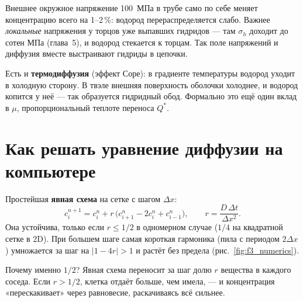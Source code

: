 
\begin{zrbox}
Внешнее окружное напряжение 100~МПа в трубе само по себе меняет концентрацию всего на 1--2\,\%: водород
перераспределяется слабо. Важнее \emph{локальные} напряжения у торцов уже выпавших гидридов --- там $\sigma_h$
доходит до сотен МПа (глава~5), и водород стекается к торцам. Так поле напряжений и диффузия вместе
выстраивают гидриды в цепочки.
\end{zrbox}

Есть и \textbf{термодиффузия} (эффект Соре): в градиенте температуры водород уходит в холодную сторону. В твэле
внешняя поверхность оболочки холоднее, и водород копится у неё --- так образуется гидридный обод. Формально это
ещё один вклад в $\mu$, пропорциональный теплоте переноса $Q^*$.

\section{Как решать уравнение диффузии на компьютере}

Простейшая \textbf{явная схема} на сетке с шагом $\Delta x$:
\begin{equation}
c_i^{n+1} = c_i^n + r\,\bigl(c_{i+1}^n - 2c_i^n + c_{i-1}^n\bigr),\qquad r = \frac{D\,\Delta t}{\Delta x^2}.
\end{equation}
Она устойчива, только если $r \le 1/2$ в одномерном случае ($1/4$ на квадратной сетке в 2D). При большем шаге
самая короткая гармоника (пила с периодом $2\Delta x$) умножается за шаг на $|1-4r| > 1$ и растёт без предела
(рис.~\ref{fig:f3_numerics}).


\begin{idea}
Почему именно $1/2$? Явная схема переносит за шаг долю $r$ вещества в каждого соседа. Если $r > 1/2$, клетка
отдаёт больше, чем имела, --- и концентрация «перескакивает» через равновесие, раскачиваясь всё сильнее.
\end{idea}

